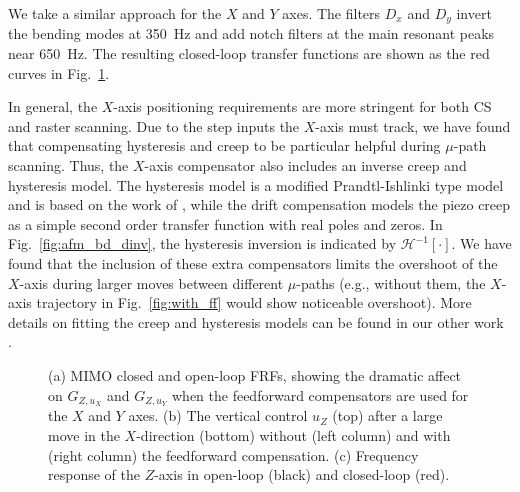 \documentclass[twocolumn,oneside]{IEEEtran/IEEEtran}
\begin{document}
We take a similar approach for the $X$ and $Y$ axes. The filters $D_x$
and $D_y$ invert the bending modes at 350~Hz and add notch filters at
the main resonant peaks near 650~Hz. The resulting closed-loop
transfer functions are shown as the red curves in
Fig.~\ref{fig:mimo_frf_uxuy}.

In general, the $X$-axis positioning requirements are more stringent
for both CS and raster scanning. Due to the step inputs the $X$-axis must track, we have found that
compensating hysteresis and creep to be particular helpful during $\mu$-path scanning. Thus,
the $X$-axis compensator also includes an inverse creep and hysteresis
model. The hysteresis model is a modified Prandtl-Ishlinki type model
and is based on the work of \cite{kuhnen_modeling_2003}, while the
drift compensation models the piezo creep as a simple second order
transfer function with real poles and zeros. In
Fig.~\ref{fig:afm_bd_dinv}, the hysteresis inversion is indicated by
$\mathcal{H}^{-1}[\cdot]$. We have found that the inclusion of these
extra compensators limits the overshoot of the $X$-axis during larger
moves between different $\mu$-paths (e.g., without them, the $X$-axis trajectory in Fig.~\ref{fig:with_ff} would show noticeable overshoot). More details on fitting the creep
and hysteresis models can be found in our other work \cite{braker_afmmpc_2019}.

\begin{figure}
  \centering
  \begin{subfigure}[b]{.65\textwidth}
    
    \caption{}\label{fig:mimo_frf_uxuy}
  \end{subfigure}\hfill
  \begin{subfigure}[b]{.34\textwidth}
    
    \caption{}\label{fig:with_ff}
    \vspace{2ex}
    
    \caption{}\label{fig:z_control}
  \end{subfigure}
  \caption{(a) MIMO closed and open-loop FRFs, showing the dramatic
    affect on $G_{Z,u_X}$ and $G_{Z,u_Y}$ when the feedforward
    compensators are used for the $X$ and $Y$ axes. (b) The vertical control $u_Z$ (top) after a large move in the $X$-direction (bottom) without (left column) and with (right column) the feedforward compensation. (c) Frequency response of the $Z$-axis in open-loop (black) and closed-loop (red). }
\end{figure}
\end{document}
